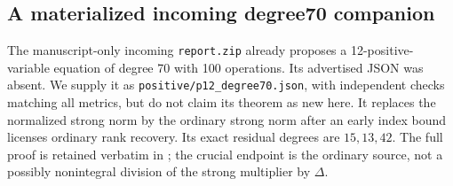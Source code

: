 \subsection{A materialized incoming degree70 companion}
\sloppy
The manuscript-only incoming \texttt{report.zip} already proposes a
12-positive-variable equation of degree 70 with 100 operations.  Its advertised
JSON was absent.  We supply it as
\texttt{positive/p12\_degree70.json}, with independent checks matching
all metrics, but do not claim its theorem as new here.  It replaces the
normalized strong norm by the ordinary strong norm after an early index
bound licenses ordinary rank recovery.  Its exact residual degrees are
$15,13,42$.  The full proof is retained verbatim in
; the crucial endpoint
is the ordinary source, not a possibly nonintegral division of the strong
multiplier by $\Delta$.
